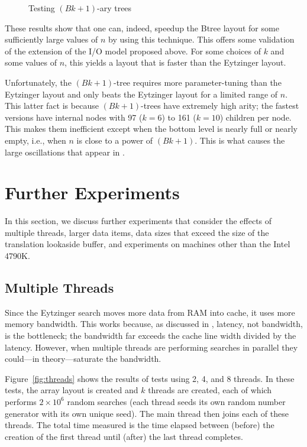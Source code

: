 \documentclass{patmorin}
\begin{document}
\begin{figure}
   \caption{Testing $(Bk+1)$-ary trees}
\end{figure}

These results show that one can, indeed, speedup the Btree layout for some
sufficiently large values of $n$ by using this technique.  This offers
some validation of the extension of the I/O model proposed above.
For some choices of $k$ and some values of $n$, this yields a layout
that is faster than the Eytzinger layout.

Unfortunately, the $(Bk+1)$-tree requires more parameter-tuning than the
Eytzinger layout and only beats the Eytzinger layout for a limited range
of $n$.  This latter fact is because $(Bk+1)$-trees have extremely high
arity; the fastest versions have internal nodes with 97 ($k=6$) to 161
($k=10$) children per node. This makes them inefficient except when the
bottom level is nearly full or nearly empty, i.e., when $n$ is close to
a power of $(Bk+1)$.  This is what causes the large oscillations that
appear in .

\section{Further Experiments}

In this section, we discuss further experiments that consider the effects
of multiple threads, larger data items, data sizes that exceed the size
of the translation lookaside buffer, and experiments on machines other
than the Intel 4790K.

\subsection{Multiple Threads}

Since the Eytzinger search moves more data from RAM into cache,
it uses more memory bandwidth.  This works because, as discussed in
, latency, not bandwidth, is the bottleneck; the
bandwidth far exceeds the cache line width divided by the latency.
However, when multiple threads are performing searches in parallel they
could---in theory---saturate the bandwidth.

Figure~\ref{fig:threads} shows the results of tests
using 2, 4, and 8 threads.  In these tests, the array layout is created
and $k$ threads are created, each of which performs $2\times 10^6$
random searches (each thread seeds its own random number generator
with its own unique seed).  The main thread then joins each of these
threads. The total time measured is the time elapsed between (before)
the creation of the first thread until (after) the last thread completes.
\end{document}
